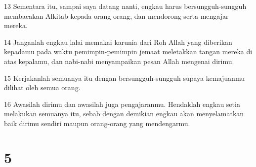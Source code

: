 \par 13 Sementara itu, sampai saya datang nanti, engkau harus bersungguh-sungguh membacakan Alkitab kepada orang-orang, dan mendorong serta mengajar mereka.
\par 14 Janganlah engkau lalai memakai karunia dari Roh Allah yang diberikan kepadamu pada waktu pemimpin-pemimpin jemaat meletakkan tangan mereka di atas kepalamu, dan nabi-nabi menyampaikan pesan Allah mengenai dirimu.
\par 15 Kerjakanlah semuanya itu dengan bersungguh-sungguh supaya kemajuanmu dilihat oleh semua orang.
\par 16 Awasilah dirimu dan awasilah juga pengajaranmu. Hendaklah engkau setia melakukan semuanya itu, sebab dengan demikian engkau akan menyelamatkan baik dirimu sendiri maupun orang-orang yang mendengarmu.

\chapter{5}

